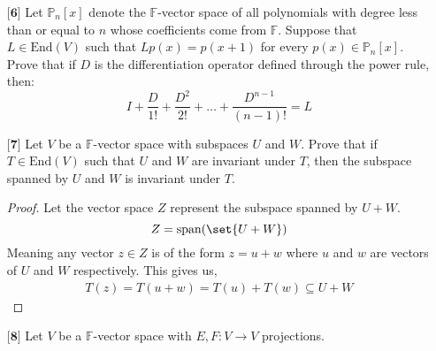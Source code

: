 \documentclass[12pt]{article}
\DeclarePairedDelimiter\set\{\}
\begin{document}
\begin{itemize}
\begin{proof}
        So, no. If we have two linear transformation $S$ and $T$ such that $ST = 0$ it does not follow that $TS = 0$
    \end{proof}
    \vspace{.5cm}
    \item[$\textbf{[6]}$]
    Let $\mathbb{P}_n[x]$ denote the $\mathbb{F}$-vector space of all polynomials with degree less than or equal to $n$ whose coefficients come from $\mathbb{F}$. Suppose that $L \in \text{End}(V)$ such that $Lp(x) = p(x + 1)$ for every $p(x) \in \mathbb{P}_n[x]$. Prove that if $D$ is the differentiation operator defined through the power rule, then:
    \begin{equation*}
    I + \frac{D}{1!} + \frac{D^2}{2!} + \dots + \frac{D^{n-1}}{(n - 1)!} = L
    \end{equation*}
    
    \vspace{.5cm}
    \item[$\textbf{[7]}$]
    Let $V$ be a $\mathbb{F}$-vector space with subspaces $U$ and $W$. Prove that if $T \in \text{End}(V)$ such that $U$ and $W$ are invariant under $T$, then the subspace spanned by $U$ and $W$ is invariant under $T$. 

    \begin{proof}
        Let the vector space $Z$ represent the subspace spanned by $U+W$.
        \[Z = \text{span}(\set{U+W})\]
        Meaning any vector $z\in Z$ is of the form $z = u + w$ where $u$ and $w$ are vectors of $U$ and $W$ respectively. This gives us,
        \begin{align*}
            T(z) = T(u + w) = T(u) + T(w) \subseteq U + W
        \end{align*}
    \end{proof}
    
    \item[$\textbf{[8]}$]
    Let $V$ be a $\mathbb{F}$-vector space with $E,F: V \rightarrow V$ projections. 
    \begin{itemize}


\end{itemize}
\end{itemize}
\end{document}
